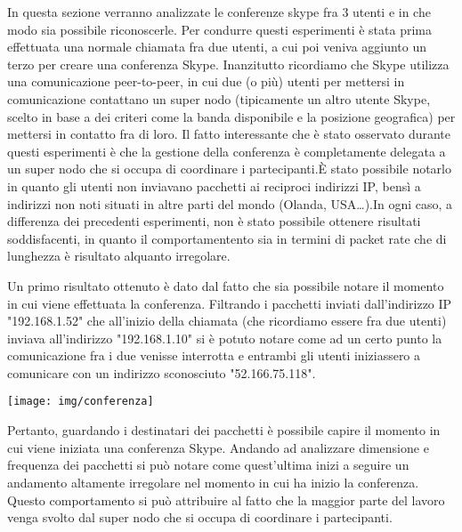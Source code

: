 In questa sezione verranno analizzate le conferenze skype fra 3 utenti e in che modo sia possibile riconoscerle. Per condurre questi esperimenti è stata prima effettuata una normale chiamata fra due utenti, a cui poi veniva aggiunto un terzo per creare una conferenza Skype.\newline\newline
Inanzitutto ricordiamo che Skype utilizza una comunicazione peer-to-peer, in cui due (o più) utenti per mettersi in comunicazione contattano un super nodo (tipicamente un altro utente Skype, scelto in base a dei criteri come la banda disponibile e la posizione geografica) per mettersi in contatto fra di loro.\newline
Il fatto interessante che è stato osservato durante questi esperimenti è che la gestione della conferenza è completamente delegata a un super nodo che si occupa di coordinare i partecipanti.\newline È stato possibile notarlo in quanto gli utenti non inviavano pacchetti ai reciproci indirizzi IP, bensì a indirizzi non noti situati in altre parti del mondo (Olanda, USA\dots).\newline In ogni caso, a differenza dei precedenti esperimenti, non è stato possibile ottenere risultati soddisfacenti, in quanto il comportamentento sia in termini di packet rate che di lunghezza è risultato alquanto irregolare.\newline\newline

Un primo risultato ottenuto è dato dal fatto che sia possibile notare il momento in cui viene effettuata la conferenza. Filtrando i pacchetti inviati dall'indirizzo IP "192.168.1.52" che all'inizio della chiamata (che ricordiamo essere fra due utenti) inviava all'indirizzo "192.168.1.10" si è potuto notare come ad un certo punto la comunicazione fra i due venisse interrotta e entrambi gli utenti iniziassero a comunicare con un indirizzo sconosciuto "52.166.75.118".

\begin{center}
\begin{minipage}{\linewidth}
\texttt{[image: img/conferenza]}
\end{minipage}
\end{center}

Pertanto, guardando i destinatari dei pacchetti è possibile capire il momento in cui viene iniziata una conferenza Skype.\newline
Andando ad analizzare dimensione e frequenza dei pacchetti si può notare come quest'ultima inizi a seguire un andamento altamente irregolare nel momento in cui ha inizio la conferenza. Questo comportamento si può attribuire al fatto che la maggior parte del lavoro venga svolto dal super nodo che si occupa di coordinare i partecipanti.

